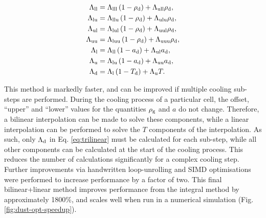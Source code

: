 \begin{equation}
  \label{eq:trilinear}
  \begin{split}
    \Lambda_\text{ll} &=\Lambda_\text{lll}\left(1-\rho_\text{d}\right)+\Lambda_\text{ull} \rho_\text{d}, \\
    \Lambda_\text{lu} &=\Lambda_\text{llu}\left(1-\rho_\text{d}\right)+\Lambda_\text{ulu} \rho_\text{d}, \\
    \Lambda_\text{ul} &=\Lambda_\text{lul}\left(1-\rho_\text{d}\right)+\Lambda_\text{uul} \rho_\text{d}, \\
    \Lambda_\text{uu} &=\Lambda_\text{luu}\left(1-\rho_\text{d}\right)+\Lambda_\text{uuu} \rho_\text{d}, \\
    \Lambda_\text{l} &=\Lambda_\text{ll}\left(1-a_\text{d}\right)+\Lambda_\text{ul} a_\text{d}, \\
    \Lambda_\text{u} &=\Lambda_\text{lu}\left(1-a_\text{d}\right)+\Lambda_\text{uu} a_\text{d}, \\
    \Lambda_\text{d} &=\Lambda_\text{l}\left(1-T_\text{d}\right)+\Lambda_\text{u} T.
  \end{split}
\end{equation}

\noindent
This method is markedly faster, and can be improved if multiple cooling sub-steps are performed.
During the cooling process of a particular cell, the offset, ``upper'' and ``lower'' values for the quantities $\rho_\text{g}$ and $a$ do not change.
Therefore, a bilinear interpolation can be made to solve these components, while a linear interpolation can be performed to solve the $T$ components of the interpolation.
As such, only $\Lambda_\text{d}$ in Eq. \ref{eq:trilinear} must be calculated for each sub-step, while all other components can be calculated at the start of the cooling process.
This reduces the number of calculations significantly for a complex cooling step.
Further improvements via handwritten loop-unrolling and SIMD optimisations were performed to increase performance by a factor of two.
This final bilinear+linear method improves performance from the integral method by approximately \num{1800}\%, and scales well when run in a numerical simulation (Fig. \ref{fig:dust-opt-speedup}).

